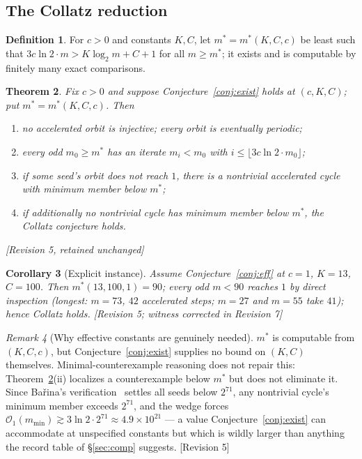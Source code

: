\documentclass[11pt]{article}
\theoremstyle{plain}
\newtheorem{theorem}{Theorem}[section]
\newtheorem{corollary}[theorem]{Corollary}
\theoremstyle{definition}
\newtheorem{definition}[theorem]{Definition}
\theoremstyle{remark}
\newtheorem{remark}[theorem]{Remark}
\newcommand{\Occ}{\mathcal{O}}
\newcommand{\status}[1]{\textsf{\footnotesize[#1]}}
\begin{document}
\subsection{The Collatz reduction}

\begin{definition}\label{def:mstar}
For $c>0$ and constants $K,C$, let $m^*=m^*(K,C,c)$ be least such that
$3c\ln2\cdot m>K\log_2 m+C+1$ for all $m\ge m^*$; it exists and is computable by finitely many
exact comparisons.
\end{definition}

\begin{theorem}\label{thm:reduction}
Fix $c>0$ and suppose Conjecture~\ref{conj:exist} holds at $(c,K,C)$; put $m^*=m^*(K,C,c)$. Then
\begin{enumerate}[label=(\roman*),leftmargin=2em]
\item no accelerated orbit is injective; every orbit is eventually periodic;
\item every odd $m_0\ge m^*$ has an iterate $m_i<m_0$ with $i\le\lfloor 3c\ln2\cdot m_0\rfloor$;
\item if some seed's orbit does not reach $1$, there is a nontrivial accelerated cycle with minimum
  member below $m^*$;
\item if additionally no nontrivial cycle has minimum member below $m^*$, the Collatz conjecture
  holds.
\end{enumerate}
\status{Revision 5, retained unchanged}
\end{theorem}

\begin{corollary}[Explicit instance]\label{cor:explicit}
Assume Conjecture~\ref{conj:eff} at $c=1$, $K=13$, $C=100$. Then $m^*(13,100,1)=90$; every odd
$m<90$ reaches $1$ by direct inspection (longest: $m=73$, $42$ accelerated steps; $m=27$ and
$m=55$ take $41$); hence Collatz holds. \status{Revision 5; witness corrected in Revision 7}
\end{corollary}

\begin{remark}[Why effective constants are genuinely needed]
$m^*$ is computable from $(K,C,c)$, but Conjecture~\ref{conj:exist} supplies no bound on $(K,C)$
themselves. Minimal-counterexample reasoning does not repair this: Theorem~\ref{thm:reduction}(ii)
localizes a counterexample below $m^*$ but does not eliminate it. Since Ba\v{r}ina's
verification~\cite{Barina2025} settles all seeds below $2^{71}$, any nontrivial cycle's minimum member
exceeds $2^{71}$, and the wedge forces $\Occ_1(m_{\min})\gtrsim 3\ln2\cdot2^{71}\approx4.9\times10^{21}$
--- a value Conjecture~\ref{conj:exist} can accommodate at unspecified constants but which is
wildly larger than anything the record table of \S\ref{sec:comp} suggests. \status{Revision 5}
\end{remark}
\end{document}
